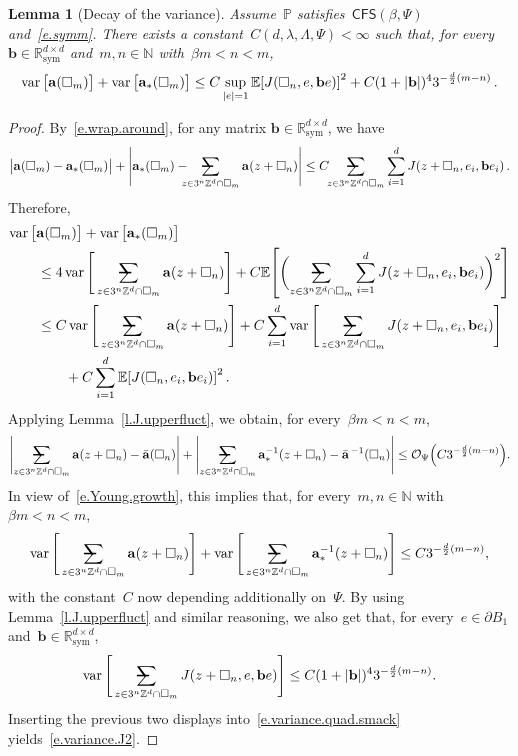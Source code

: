 \documentclass[11pt]{article} %
\makeatletter
\let\oldsquare\square %
\renewcommand{\square}{\oldsquare}
\numberwithin{equation}{section}
\newtheorem{lemma}[theorem]{Lemma}
\theoremstyle{definition}
\let\originalleft\left
\let\originalright\right
\renewcommand{\left}{\mathopen{}\mathclose\bgroup\originalleft}
\renewcommand{\right}{\aftergroup\egroup\originalright}
\newcommand*{\N}{\ensuremath{\mathbb{N}}}
\newcommand*{\R}{\ensuremath{\mathbb{R}}}
\newcommand*{\Zd}{\ensuremath{\mathbb{Z}^d}}
\renewcommand{\b}{\ensuremath{\mathbf{b}}}
\newcommand{\sym}{\mathrm{sym}}
\renewcommand{\a}{\mathbf{a}}
\newcommand{\ahom}{\bar{\a}}
\newcommand{\cu}{\square}
\renewcommand{\P}{\mathbb{P}}
\newcommand{\E}{\mathbb{E}}
\renewcommand{\O}{\mathcal{O}}
\DeclareMathOperator{\var}{var}
\newcommand{\avsum}{\mathop{\mathpalette\avsuminner\relax}\displaylimits}
\newcommand\avsuminner[2]{%
  {\sbox0{$\m@th#1\sum$}%
   \vphantom{\usebox0}%
   \ooalign{%
     \hidewidth
     \smash{\,\rule[.23em]{8.8pt}{1.1pt} \relax}%
     \hidewidth\cr
     $\m@th#1\sum$\cr
   }%
  }%
}
\newcommand{\CFS}{\mathsf{CFS}}
\makeatother
\begin{document}
\begin{lemma}[Decay of the variance]
\label{l.flatness}
Assume~$\P$ satisfies~$\CFS(\beta,\Psi)$ and~\eqref{e.symm}.
There exists a constant~$C(d,\lambda,\Lambda,\Psi)<\infty$ such that, for every~$\b\in \R^{d\times d}_{\sym}$ and~$m,n\in\N$ with~$\beta m  < n < m$,  
\begin{align}
\label{e.variance.J2}
\var\big[ \a(\cu_m) \big] 
+
\var\big[ \a_*(\cu_m) \big] 
\leq
C
\sup_{|e|=1}
\E \left[ J(\cu_n,e,\b e) \right]^2
+
C(1+|\b|)^4
3^{-\frac d2(m-n)}
\,.
\end{align}
\end{lemma}
\begin{proof}
By~\eqref{e.wrap.around},
for any matrix $\b \in \R^{d\times d}_{\sym}$, we have
\begin{align*}
\bigl| \a (\cu_m) - \a_*(\cu_m) \bigr| + 
\Biggl| \a_*(\cu_m) - \!\!\!\! \avsum_{z\in 3^n\Zd\cap\cu_m}
\a(z+\cu_n) \Biggr| 
\leq 
C \!\! \avsum_{z\in 3^n\Zd\cap\cu_m}
\sum_{i=1}^d
J(z+\cu_n,e_i,\b e_i) 
\,.
\end{align*}
Therefore, 
\begin{align}
\label{e.variance.quad.smack}
\lefteqn{
\var\big[ \a(\cu_m) \big] 
+
\var\big[ \a_*(\cu_m) \big] 
} \qquad & 
\notag \\ & 
\leq 
4\var \Bigg[ \avsum_{z\in 3^n\Zd\cap\cu_m}
\a(z+\cu_n) \Bigg] 
+ C
\E \left[ 
\biggl( \avsum_{z\in 3^n\Zd\cap\cu_m}
\sum_{i=1}^d
J(z+\cu_n,e_i,\b e_i) 
\biggr)^2 \right]
\notag \\ & 
\leq
C\var \Bigg[ \avsum_{z\in 3^n\Zd\cap\cu_m}
\a(z+\cu_n) \Bigg] 
+
C\sum_{i=1}^d
\var \Bigg[ \avsum_{z\in 3^n\Zd\cap\cu_m}
J(z+\cu_n,e_i,\b e_i) \Bigg] 
\notag \\ & \qquad 
+ C
\sum_{i=1}^d 
\E \left[ J(\cu_n,e_i,\b e_i) \right]^2
\,. 
\end{align}
Applying Lemma~\ref{l.J.upperfluct}, we obtain, for every~$\beta m < n < m$, 
\begin{align*}
\Biggl| \avsum_{z\in 3^{n} \Zd\cap\cu_{m}} 
\a(z+\cu_{n}) 
- 
\ahom(\cu_n) \Biggr|
+
\Biggl| \avsum_{z\in 3^{n} \Zd\cap\cu_{m}} 
\a_*^{-1}(z+\cu_{n}) 
- 
\ahom^{\,-1}(\cu_n) \Biggr|
\leq
\O_\Psi \left( C3^{-\frac d2(m-n)} \right)
.
\end{align*}
In view of~\eqref{e.Young.growth}, this implies that, for every~$m,n\in\N$ with~$\beta m<n<m$, 
\begin{align*}
\var \Bigg[ \avsum_{z\in 3^n \Zd\cap\cu_{m}} 
\a(z+\cu_{n}) \Bigg] 
+
\var \Bigg[ \avsum_{z\in 3^n \Zd\cap\cu_{m}} 
\a_*^{-1}(z+\cu_{n}) \Bigg] 
\leq 
C  
3^{-\frac d2 (m-n)},
\end{align*}
with the constant~$C$ now depending additionally on~$\Psi$. By using Lemma~\ref{l.J.upperfluct} and similar reasoning, we also get that, for every~$e\in \partial B_1$ and~$\b \in \R^{d\times d}_{\sym}$, 
\begin{align}
\label{e.Jvarbound}
\var \Bigg[ \avsum_{z\in 3^n\Zd\cap\cu_m}
J(z+\cu_n,e,\b e) \Bigg] 
\leq
C(1+|\b|)^4 
3^{-\frac d2(m-n)}.
\end{align}
Inserting the previous two displays into~\eqref{e.variance.quad.smack} yields~\eqref{e.variance.J2}. 
\end{proof}
\end{document}
